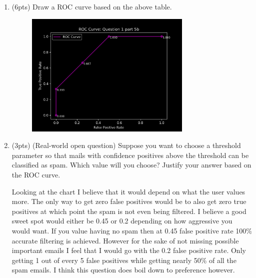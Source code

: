 \documentclass[a4paper]{article}
\theoremstyle{definition}
\newenvironment{soln}{
    \leavevmode\color{blue}\ignorespaces
}{}
\begin{document}
\begin{enumerate}
\begin{enumerate}
	\item (6pts) Draw a ROC curve based on the above table.
	\begin{soln}
            \begin{figure}[H]
                \centering
                \includegraphics[width=0.75\textwidth]{figs/q1/p5/q1-p5roc_curve_q1-p5b.png} 
                \captionsetup{labelformat=empty}
                \caption{}
                \label{fig:my_label}
             \end{figure}
        \end{soln}
	
	\item (3pts) (Real-world open question) Suppose you want to choose a threshold parameter so that mails with confidence positives above the threshold can be classified as spam. Which value will you choose? Justify your answer based on the ROC curve.\\
	
	\begin{soln}
            Looking at the chart  I believe that it would depend on what the user values more. The only way to get zero false positives would be to also get zero true positives at which point the spam is not even being filtered. I believe a good sweet spot would either be 0.45 or 0.2 depending on how aggressive you would want. If you value having no spam then at 0.45 false positive rate 100\% accurate filtering is achieved. However for the sake of not missing possible important emails I feel that I would go with the 0.2 false positive rate. Only getting 1 out of every 5 false positives while getting nearly 50\% of all the spam emails. I think this question does boil down to preference however.
        \end{soln}\\
\end{enumerate}


\end{enumerate}
\end{document}
